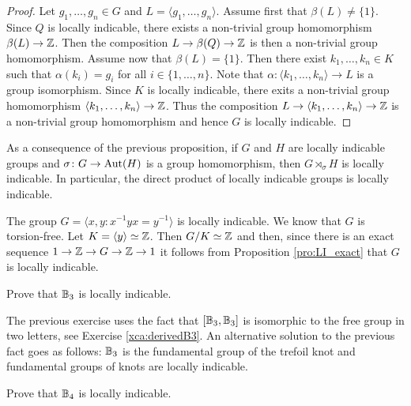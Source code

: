 \begin{proof}
    Let $g_1,\dots,g_n\in G$ and $L=\langle g_1,\dots,g_n\rangle$. 
    Assume first that $\beta(L)\ne\{1\}$. Since $Q$ is locally indicable, 
    there exists a non-trivial group homomorphism $\beta(L)\to\mathbb{Z}$. Then the 
    composition $L\to\beta(Q)\to\mathbb{Z}$ is then a non-trivial group homomorphism. Assume now
    that $\beta(L)=\{1\}$. Then there exist $k_1,\dots,k_n\in K$ 
    such that $\alpha(k_i)=g_i$ for all $i\in\{1,\dots,n\}$. Note that
    $\alpha\colon \langle k_1,\dots,k_n\rangle\to L$ is a group isomorphism. Since
    $K$ is locally indicable, there exits a non-trivial group 
    homomorphism $\langle k_1,\dots,k_n\rangle\to\mathbb{Z}$. 
    Thus the composition $L\to\langle k_1,\dots,k_n\rangle\to\mathbb{Z}$ is a non-trivial
    group homomorphism 
    and hence $G$ is locally indicable. 
\end{proof}

As a consequence of the previous proposition, 
if $G$ and $H$ are locally indicable groups and 
$\sigma\colon G\to\operatorname{Aut}(H)$ is a group homomorphism, then 
$G\rtimes_\sigma H$ is locally indicable. In particular, the 
direct product of locally indicable groups is locally indicable.

\begin{example}
    The group $G=\langle x,y:x^{-1}yx=y^{-1}\rangle$ is
    locally indicable. We know that $G$ is torsion-free. Let 
    $K=\langle y\rangle\simeq\mathbb{Z}$. Then $G/K\simeq\mathbb{Z}$ and 
    then, since there is an exact sequence
    $1\to\mathbb{Z}\to G\to\mathbb{Z}\to1$ 
    it follows from Proposition \ref{pro:LI_exact} 
    that $G$ is locally indicable.
\end{example}


\begin{exercise}
\label{xca:B3_LI}
    Prove that $\mathbb{B}_3$ is locally indicable. 
\end{exercise}

The previous exercise uses the fact that $[\mathbb{B}_3,\mathbb{B}_3]$ is isomorphic to the free group in two letters, see
Exercise \ref{xca:derivedB3}.
An alternative solution to the previous fact goes as follows: $\mathbb{B}_3$ is the fundamental group
of the trefoil knot and fundamental groups of knots are locally indicable. 

\begin{exercise}
    Prove that $\mathbb{B}_4$ is locally indicable.
\end{exercise}

